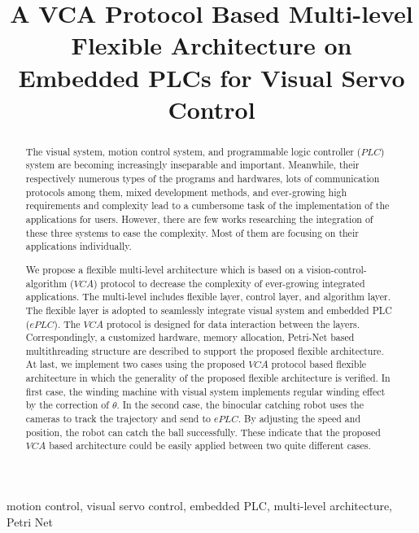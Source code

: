 \documentclass[journal,UTF8]{IEEEtran}
\begin{document}
%
\title{A VCA Protocol Based Multi-level Flexible Architecture on Embedded PLCs for Visual Servo Control }

\maketitle

\begin{abstract}
The visual system, motion control system, and programmable logic controller ($PLC$) system are becoming increasingly inseparable and important. Meanwhile, their respectively numerous types of the programs and hardwares, lots of communication protocols among them, mixed development methods, and ever-growing high requirements and complexity lead to a cumbersome task of the implementation of the applications for users. However, there are few works researching the integration of these three systems to ease the complexity. Most of them are focusing on their applications individually. 

We propose a flexible multi-level architecture which is based on a vision-control-algorithm ($VCA$) protocol to decrease the complexity of ever-growing integrated applications. The multi-level includes flexible layer, control layer, and algorithm layer. The flexible layer is adopted to seamlessly integrate visual system and embedded PLC ($ePLC$). The $VCA$ protocol is designed for data interaction between the layers. Correspondingly, a customized hardware, memory allocation, Petri-Net based multithreading structure are described to support the proposed flexible architecture. At last, we implement two cases using the proposed $VCA$ protocol based flexible architecture in which the generality of the proposed flexible architecture is verified. In first case, the winding machine with visual system implements regular winding effect by the correction of $\theta$. In the second case, the binocular catching robot uses the cameras to track the trajectory and send to $ePLC$. By adjusting the speed and position, the robot can catch the ball successfully. These indicate that the proposed $VCA$ based architecture could be easily applied between two quite different cases.
\end{abstract}

\begin{IEEEkeywords}
motion control, visual servo control, embedded PLC, multi-level architecture, Petri Net
\end{IEEEkeywords}
\end{document}
